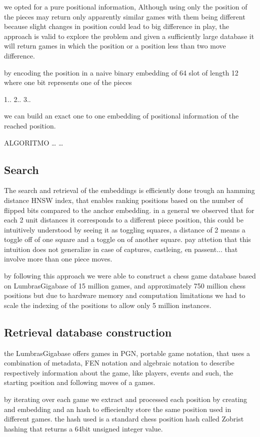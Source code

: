 we opted for a pure positional information, Although using only the position of the pieces may return only apparently similar games with them being different because 
slight changes in position could lead to big difference in play, the approach is valid to explore the problem and given a sufficiently large database it will return 
games in which the position or a position less than two move difference.

by encoding the position in a naive binary embedding of 64 slot of length 12 where one bit represents one of the pieces 

1..
2..
3..


we can build an exact one to one embedding of positional information of the reached position.

ALGORITMO
\dots
\dots

\subsection{Search}
The search and retrieval of the embeddings is efficiently done trough an hamming distance HNSW index, that enables 
ranking positions based on the number of flipped bits compared to the anchor embedding.
in a general we observed that for each 2 unit distances it corresponds to a different piece position, this could be intuitively understood 
by seeing it as toggling squares, a distance of 2 means a toggle off of one square 
and a toggle on of another square.
pay attetion that this intuition does not generalize in case of captures, castleing, en passent... that involve more than one piece moves.

by following this approach we were able to construct a chess game database based on LumbrasGigabase \cite{retrieval:lumbrasgigabase} of 15 million games, 
and approximately 750 million chess positions but due to hardware memory and computation limitations we had to scale the indexing of the positions to allow only 5 million instances.

\subsection{Retrieval database construction}
the LumbrasGigabase offers games in PGN, portable game notation, that uses a combination of metadata, FEN notation and algebraic notation to describe 
respectively information about the game, like players, events and such, the starting position and following moves of a games.


by iterating over each game we extract and processed each position by creating and embedding and an hash to effiecienlty store the same position used in different games.
the hash used is a standard chess position hash called Zobrist hashing \cite{retrieval:zobristhash} that returns a 64bit unsigned integer value.


